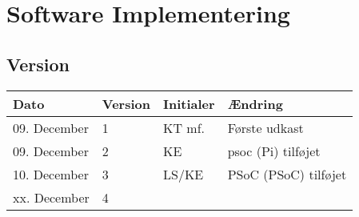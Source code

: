 \chapter{Software Implementering}\label{ch:sw_impl}
\section*{Version}
\begin{table}[h]
	\centering
	\begin{tabularx}{\textwidth - 2cm}{|l|l|l|X|}
	\hline
	Dato			& Version			& Initialer 		& Ændring				\\ \hline
	09. December	& 1 				& KT mf.	 		& Første udkast			\\ \hline
	09. December	& 2 				& KE		 		& psoc (Pi) tilføjet	\\ \hline
	10. December	& 3 				& LS/KE		 		& PSoC (PSoC) tilføjet	\\ \hline
	xx. December	& 4 				& 			 		& 						\\ \hline
	\end{tabularx}
\end{table}
\clearpage


